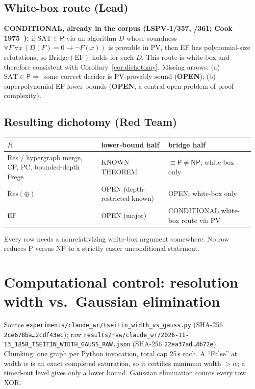 \documentclass[11pt]{article}
\theoremstyle{definition}
\newcommand{\SAT}{\mathrm{SAT}}
\begin{document}
\subsection*{White-box route (Lead)}
\textbf{CONDITIONAL, already in the corpus (LSPV-1/357, /361; Cook 1975~\cite{Cook75}):} if
$\SAT\in\mathsf P$ via an algorithm $D$ whose soundness
$\forall F\,\forall x\,(D(F)=0\to\neg F(x))$ is provable in $\mathrm{PV}$, then EF has polynomial-size
refutations, so $\mathrm{Bridge}(\mathrm{EF})$ holds for such $D$. This route is white-box and therefore
consistent with Corollary~\ref{cor:dichotomy}. Missing arrows: (a) $\SAT\in\mathsf P\Rightarrow$ some
correct decider is PV-provably sound (\textbf{OPEN}); (b) superpolynomial EF lower bounds (\textbf{OPEN},
a central open problem of proof complexity).

\subsection*{Resulting dichotomy (Red Team)}
\begin{center}
\begin{tabular}{@{}lll@{}}
\toprule
$R$ & lower-bound half & bridge half \\
\midrule
Res / hypergraph merge, CP, PC, bounded-depth Frege & KNOWN THEOREM & $\equiv\mathsf P\ne\mathsf{NP}$; white-box only\\
$\mathrm{Res}(\oplus)$ & OPEN (depth-restricted known) & OPEN; white-box only\\
EF & OPEN (major) & CONDITIONAL white-box route via PV\\
\bottomrule
\end{tabular}
\end{center}
Every row needs a nonrelativizing white-box argument somewhere. No row reduces P versus NP to a
strictly easier unconditional statement.

\section{Computational control: resolution width vs.\ Gaussian elimination}
Source \texttt{experiments/claude\_wr/tseitin\_width\_vs\_gauss.py}
(SHA-256 \texttt{2ce678ba\ldots 2cdf43ec}); raw
\texttt{results/raw/claude\_wr/2026-11-13\_1858\_TSEITIN\_WIDTH\_GAUSS\_RAW.json}
(SHA-256 \texttt{22ea37ad\ldots 4b72e}).
Chunking: one graph per Python invocation, total cap 25\,s each. A ``False'' at width $w$ is an
exact completed saturation, so it certifies minimum width $>w$; a timed-out level gives only a lower bound.
Gaussian elimination counts every row XOR.
\end{document}

